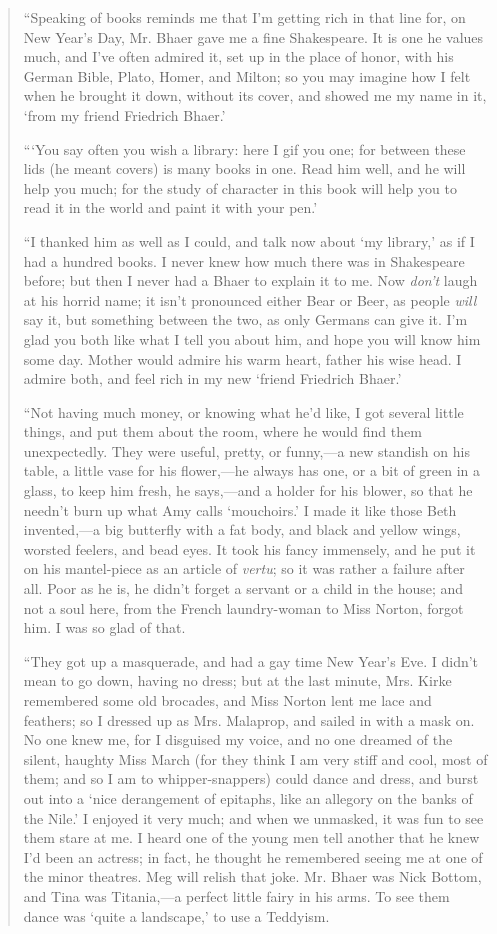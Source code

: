 \begin{quote}
``Speaking of books reminds me that I'm getting rich in
that line for, on New Year's Day, Mr. Bhaer gave me a
fine Shakespeare. It is one he values much, and I've
often admired it, set up in the place of honor, with his German Bible,
Plato, Homer, and Milton; so you may imagine how I felt when he brought
it down, without its cover, and showed me my name in it,
`from my friend Friedrich Bhaer.'

```You say often you wish a library: here I gif you one;
for between these lids (he meant covers) is many books in one. Read him
well, and he will help you much; for the study of character in this book
will help you to read it in the world and paint it with your
pen.'

``I thanked him as well as I could, and talk now about
`my library,' as if I had a hundred
books. I never knew how much there was in Shakespeare before; but then I
never had a Bhaer to explain it to me. Now \emph{don't}
laugh at his horrid name; it isn't pronounced either
Bear or Beer, as people \emph{will} say it, but something between the
two, as only Germans can give it. I'm glad you both like
what I tell you about him, and hope you will know him some day. Mother
would admire his warm heart, father his wise head. I admire both, and
feel rich in my new `friend Friedrich
Bhaer.'

``Not having much money, or knowing what he'd like, I got
several little things, and put them about the room, where he would find
them unexpectedly. They were useful, pretty, or funny,---a new standish
on his table, a little vase for his flower,---he always has one, or a
bit of green in a glass, to keep him fresh, he says,---and a holder for
his blower, so that he needn't burn up what Amy calls
`mouchoirs.' I made it like those Beth
invented,---a big butterfly with a fat body, and black and yellow wings,
worsted feelers, and bead eyes. It took his fancy immensely, and he put
it on his mantel-piece as an article of \emph{vertu}; so it was rather a
failure after all. Poor as he is, he didn't forget a
servant or a child in the house; and not a soul here, from the French
laundry-woman to Miss Norton, forgot him. I was so glad of that.

``They got up a masquerade, and had a gay time New Year's
Eve. I didn't mean to go down, having no dress; but at
the last minute, Mrs. Kirke remembered some old brocades, and Miss
Norton lent me lace and feathers; so I dressed up as Mrs. Malaprop, and
sailed in with a mask on. No one knew me, for I disguised my voice, and
no one dreamed of the silent, haughty Miss March (for they think I am
very stiff and cool, most of them; and so I am to whipper-snappers)
could dance and dress, and burst out into a `nice
derangement of epitaphs, like an allegory on the banks of the
Nile.' I enjoyed it very much; and when we unmasked, it
was fun to see them stare at me. I heard one of the young men tell
another that he knew I'd been an actress; in fact, he
thought he remembered seeing me at one of the minor theatres. Meg will
relish that joke. Mr. Bhaer was Nick Bottom, and Tina was Titania,---a
perfect little fairy in his arms. To see them dance was
`quite a landscape,' to use a Teddyism.


\end{quote}
